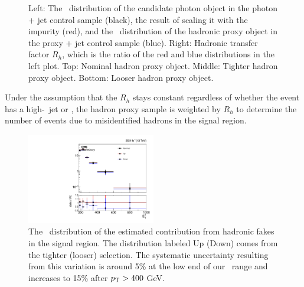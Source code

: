 \begin{figure}[htbp]
{  }
  \caption{
    Left: The \pt\ distribution of the candidate photon object in the photon + jet control sample (black), the result of scaling it with the impurity (red), and the \pt\ distribution of the hadronic proxy object in the proxy + jet control sample (blue).
    Right: Hadronic transfer factor $R_{h}$, which is the ratio of the red and blue distributions in the left plot. 
    Top: Nominal hadron proxy object. 
    Middle: Tighter hadron proxy object. 
    Bottom: Looser hadron proxy object.
  }
  \label{fig:hadronTFactor}
\end{figure}


Under the assumption that the $R_{h}$ stays constant regardless of
whether the event has a high-\pt\ jet or \met, the hadron proxy sample
is weighted by $R_{h}$ to determine the number of events due to
misidentified hadrons in the signal region.

\begin{figure}[htbp]
  \centering
  \includegraphics[width=0.5\textwidth]{Analysis/Figures/hfake/shape_sample.pdf}
  \caption{
    The \pt\ distribution of the estimated contribution from hadronic fakes in the signal region. 
    The distribution labeled Up (Down) comes from the tighter (looser) selection. 
    The systematic uncertainty resulting from this variation is around 5\% at the low end of our \pt\ range and increases to 15\% after $p_{\mathrm{T}} > 400$ GeV.
  }
  \label{fig:hadronFakeShapes}
\end{figure}

